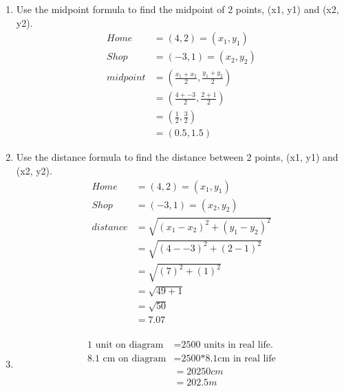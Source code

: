 \documentclass[11pt]{article}
\begin{document}
\begin{enumerate}
\begin{enumerate}
            \item Use the midpoint formula to find the midpoint of 2 points, (x1, y1) and (x2, y2).
            \begin{equation*}
                \begin{split}
                    Home&=(4,2)=(x_{1},y_{1})\\
                    Shop&=(-3,1)=(x_{2},y_{2})\\
                    midpoint&=(\frac{x_{1}+x_{2}}{2} , \frac{y_{1}+y_{2}}{2})\\
                    &=(\frac{4+-3}{2} , \frac{2+1}{2})\\
                    &=(\frac{1}{2} , \frac{3}{2})\\
                    &=(0.5,1.5)
                \end{split}
            \end{equation*}

            \item Use the distance formula to find the distance between 2 points, (x1, y1) and (x2, y2).
            \begin{equation*}
                \begin{split}
                    Home&=(4,2)=(x_{1},y_{1})\\
                    Shop&=(-3,1)=(x_{2},y_{2})\\
                    distance &= \sqrt{\left({x_1-x_2}\right)^2+\left({y_1-y_2}\right)^2}\\
                    &=\sqrt{\left({4--3}\right)^2+\left({2-1}\right)^2}\\
                    &=\sqrt{\left({7}\right)^2+\left({1}\right)^2}\\
                    &=\sqrt{49+1}\\
                    &=\sqrt{50}\\
                    &=7.07\\
                \end{split}
            \end{equation*}

            \item
            \begin{equation*}
                \begin{split}
                    \text{1 unit on diagram}&=\text{2500 units in real life.}\\
                    \text{8.1 cm on diagram}&=\text{2500*8.1cm in real life}\\
                    &=20250cm\\
                    &=202.5m\\
                \end{split}
            \end{equation*}


\end{enumerate}
\end{enumerate}
\end{document}
